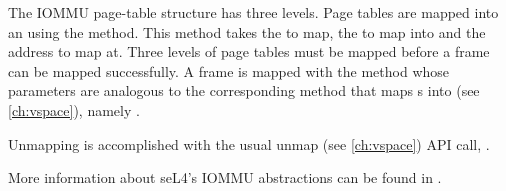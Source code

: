 The IOMMU page-table structure has three levels.
Page tables are mapped into an  using the  method.
This method takes the  to map, the  to map into 
and the address to map at. Three levels of page tables must be mapped before
a frame can be mapped successfully. A frame is mapped with the
 method whose parameters are analogous to
the corresponding method that maps s into  (see \autoref{ch:vspace}), 
namely .

Unmapping is accomplished with the usual unmap (see \autoref{ch:vspace}) API 
call,
.

More information about seL4's IOMMU abstractions can be found in \cite{Palande:M}.
\fi
